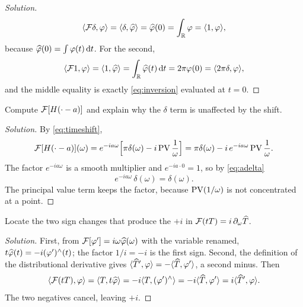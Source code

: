 \begin{proof}[Solution]
\begin{equation}
\langle \mathcal{F}\delta,\varphi\rangle=\langle \delta,\widehat{\varphi}\rangle=\widehat{\varphi}(0)=\int_{\mathbb{R}}\varphi=\langle 1,\varphi\rangle,
\end{equation}
because $\widehat{\varphi}(0)=\int\varphi(t)\,\mathrm{d} t$. For the second,
\begin{equation}
\langle \mathcal{F}1,\varphi\rangle=\langle 1,\widehat{\varphi}\rangle=\int_{\mathbb{R}}\widehat{\varphi}(t)\,\mathrm{d} t=2\pi\varphi(0)=\langle 2\pi\delta,\varphi\rangle,
\end{equation}
and the middle equality is exactly \eqref{eq:inversion} evaluated at $t=0$.
\end{proof}

\begin{exercise}\label{ex10}
Compute $\mathcal{F}[H(\cdot-a)]$ and explain why the $\delta$ term is unaffected by the shift.
\end{exercise}

\begin{proof}[Solution]
By \eqref{eq:timeshift},
\begin{equation}
\mathcal{F}[H(\cdot-a)](\omega)=e^{-ia\omega}\Big[\pi\delta(\omega)-i\operatorname{PV}\frac{1}{\omega}\Big]
=\pi\delta(\omega)-i\,e^{-ia\omega}\operatorname{PV}\frac{1}{\omega}.
\end{equation}
The factor $e^{-ia\omega}$ is a smooth multiplier and $e^{-ia\cdot0}=1$, so by \eqref{eq:adelta}
\begin{equation}
e^{-ia\omega}\,\delta(\omega)=\delta(\omega).
\end{equation}
The principal value term keeps the factor, because $\operatorname{PV}(1/\omega)$ is not concentrated at a point.
\end{proof}

\begin{exercise}\label{ex11}
Locate the two sign changes that produce the $+i$ in $\mathcal{F}(tT)=i\,\partial_{\omega}\widehat T$.
\end{exercise}

\begin{proof}[Solution]
First, from $\mathcal{F}[\varphi']=i\omega\widehat{\varphi}(\omega)$ with the variable renamed,
$t\widehat{\varphi}(t)=-i(\varphi')^{\wedge}(t)$; the factor $1/i=-i$ is the first sign. Second, the definition of
the distributional derivative gives
$\langle \widehat T',\varphi\rangle=-\langle \widehat T,\varphi'\rangle$, a second minus. Then
\begin{equation}
\langle \mathcal{F}(tT),\varphi\rangle=\langle T,t\widehat{\varphi}\rangle
=-i\langle T,(\varphi')^{\wedge}\rangle
=-i\langle \widehat T,\varphi'\rangle
=i\langle \widehat T',\varphi\rangle.
\end{equation}
The two negatives cancel, leaving $+i$.
\end{proof}

